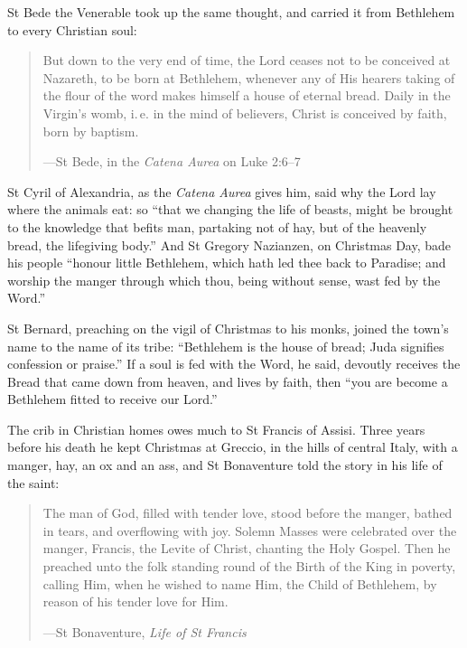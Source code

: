 St Bede the Venerable took up the same thought, and carried it
from Bethlehem to every Christian soul:

\begin{quote}
But down to the very end of time, the Lord ceases not to be conceived at
Nazareth, to be born at Bethlehem, whenever any of His hearers taking of the
flour of the word makes himself a house of eternal bread. Daily in the Virgin's
womb, i.\,e. in the mind of believers, Christ is conceived by faith, born by
baptism.\par
{\smallskip\noindent\small ---St Bede, in the \emph{Catena Aurea} on Luke 2:6--7\par}
\end{quote}

\noindent St Cyril of Alexandria, as the \emph{Catena Aurea} gives him, said why
the Lord lay where the animals eat: so ``that we changing the life of beasts,
might be brought to the knowledge that befits man, partaking not of hay, but of
the heavenly bread, the lifegiving body.'' And St Gregory Nazianzen, on
Christmas Day, bade his people ``honour little Bethlehem, which hath led thee
back to Paradise; and worship the manger through which thou, being without
sense, wast fed by the Word.''

St Bernard, preaching on the vigil of Christmas to his monks, joined
the town's name to the name of its tribe: ``Bethlehem is the house of bread;
Juda signifies confession or praise.'' If a soul is fed with the Word, he
said, devoutly receives the Bread that came down from heaven, and lives by
faith, then ``you are become a Bethlehem fitted to receive our Lord.''

The crib in Christian homes owes much to St Francis of Assisi. Three
years before his death he kept Christmas at Greccio, in the hills of central
Italy, with a manger, hay, an ox and an ass, and St Bonaventure
told the story in his life of the saint:

\begin{quote}
The man of God, filled with tender love, stood before the manger, bathed in
tears, and overflowing with joy. Solemn Masses were celebrated over the manger,
Francis, the Levite of Christ, chanting the Holy Gospel. Then he preached unto
the folk standing round of the Birth of the King in poverty, calling Him, when
he wished to name Him, the Child of Bethlehem, by reason of his tender love for
Him.\par
{\smallskip\noindent\small ---St Bonaventure, \emph{Life of St Francis}\par}
\end{quote}

